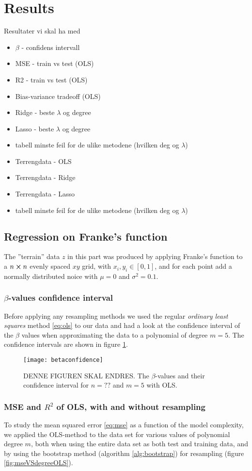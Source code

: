\section{Results}
\label{sec:results}
Resultater vi skal ha med
\begin{itemize}
\item $\beta$ - confidens intervall
\item MSE - train vs test (OLS)
\item R2 - train vs test (OLS)
\item Bias-variance tradeoff (OLS)
\item Ridge - beste $\lambda$ og degree
\item Lasso - beste $\lambda$ og degree
\item tabell minste feil for de ulike metodene (hvilken deg og $\lambda$)
\item Terrengdata - OLS
\item Terrengdata - Ridge
\item Terrengdata - Lasso
\item tabell minste feil for de ulike metodene (hvilken deg og $\lambda$)
\end{itemize}
\subsection{Regression on Franke's function}
The {''}terrain'' data $z$ in this part was produced by applying Franke's function to a $n\cross n$ evenly spaced $xy$ grid, with $x_i,y_i\in [0,1]$, and for each point add a normally distributed noice with $\mu = 0$ and $\sigma^2 = 0.1$.
\subsubsection{$\beta$-values confidence interval}
Before applying any resampling methods we used the regular \emph{ordinary least squares} method \eqref{eq:ols} to our data and had a look at the confidence interval of the $\beta$ values when approximating the data to a polynomial of degree $m=5$. The confidence intervals are shown in figure \ref{fig:betaconfidence}.

\begin{figure}[htbp]
	\centering
	\texttt{[image: betaconfidence]}
	\caption{DENNE FIGUREN SKAL ENDRES. The $\beta$-values and their confidence interval for $n=??$ and $m=5$ with OLS.}
	\label{fig:betaconfidence}
\end{figure}

\subsubsection{MSE and $R^2$ of OLS, with and without resampling}
To study the mean squared error \eqref{eq:mse} as a function of the model complexity, we applied the OLS-method to the data set for various values of polynomial degree $m$, both when using the entire data set as both test and training data, and by using the bootstrap method (algorithm \ref{alg:bootstrap}) for resampling (figure \ref{fig:mseVSdegreeOLS}).

